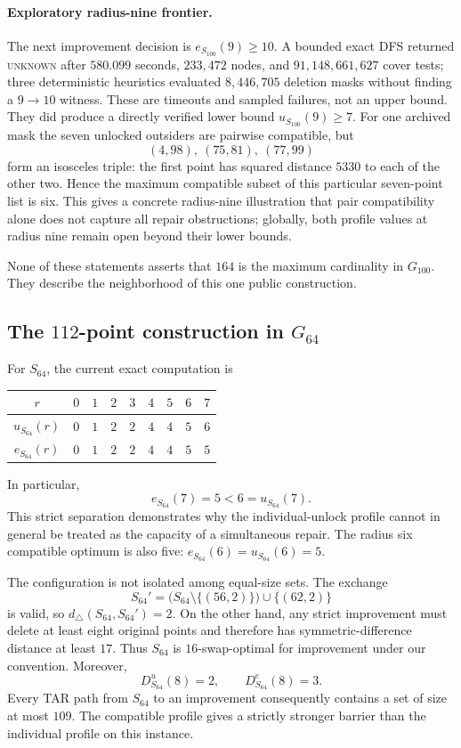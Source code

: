 \documentclass[11pt]{article}
\theoremstyle{definition}
\theoremstyle{remark}
\newcommand{\dist}{d_{\triangle}}
\begin{document}
\paragraph{Exploratory radius-nine frontier.}
The next improvement decision is $e_{S_{100}}(9)\ge10$.  A bounded exact DFS
returned \textsc{unknown} after $580.099$ seconds, $233{,}472$ nodes, and
$91{,}148{,}661{,}627$ cover tests; three deterministic heuristics evaluated
$8{,}446{,}705$ deletion masks without finding a $9\to10$ witness.  These are
timeouts and sampled failures, not an upper bound.  They did produce a directly
verified lower bound $u_{S_{100}}(9)\ge7$.  For one archived mask the seven
unlocked outsiders are pairwise compatible, but
\[
  (4,98),\ (75,81),\ (77,99)
\]
form an isosceles triple: the first point has squared distance $5330$ to each
of the other two.  Hence the maximum compatible subset of this particular
seven-point list is six.  This gives a concrete radius-nine illustration that
pair compatibility alone does not capture all repair obstructions; globally,
both profile values at radius nine remain open beyond their lower bounds.

None of these statements asserts that $164$ is the maximum cardinality in
$G_{100}$.  They describe the neighborhood of this one public construction.

\subsection{The \texorpdfstring{$112$}{112}-point construction in
\texorpdfstring{$G_{64}$}{G64}}

For $S_{64}$, the current exact computation is
\begin{center}
\begin{tabular}{c*{8}{c}}
\toprule
$r$ & $0$ & $1$ & $2$ & $3$ & $4$ & $5$ & $6$ & $7$\\
\midrule
$u_{S_{64}}(r)$ & $0$ & $1$ & $2$ & $2$ & $4$ & $4$ & $5$ & $6$\\
$e_{S_{64}}(r)$ & $0$ & $1$ & $2$ & $2$ & $4$ & $4$ & $5$ & $5$\\
\bottomrule
\end{tabular}
\end{center}
In particular,
\[
  e_{S_{64}}(7)=5<6=u_{S_{64}}(7).
\]
This strict separation demonstrates why the individual-unlock profile cannot
in general be treated as the capacity of a simultaneous repair.  The radius
six compatible optimum is also five: $e_{S_{64}}(6)=u_{S_{64}}(6)=5$.

The configuration is not isolated among equal-size sets.  The exchange
\[
  S_{64}'=\bigl(S_{64}\setminus\{(56,2)\}\bigr)\cup\{(62,2)\}
\]
is valid, so $\dist(S_{64},S_{64}')=2$.  On the other hand, any strict
improvement must delete at least eight original points and therefore has
symmetric-difference distance at least $17$.  Thus $S_{64}$ is
$16$-swap-optimal for improvement under our convention.  Moreover,
\[
 D^u_{S_{64}}(8)=2,
 \qquad
 D^e_{S_{64}}(8)=3.
\]
Every TAR path from $S_{64}$ to an improvement consequently contains a set of
size at most $109$.  The compatible profile gives a strictly stronger barrier
than the individual profile on this instance.
\end{document}
